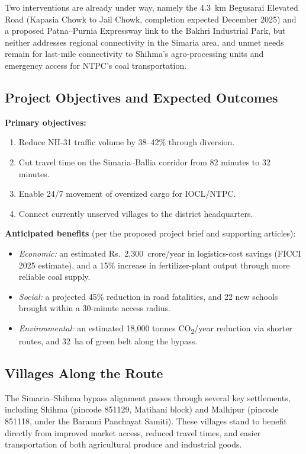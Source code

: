 \documentclass[11pt]{article}
\begin{document}
Two interventions are already under way, namely the 4.3~km Begusarai Elevated Road (Kapasia Chowk to
Jail Chowk, completion expected December 2025) and a proposed Patna--Purnia Expressway link to the
Bakhri Industrial Park, but neither addresses regional connectivity in the Simaria area, and unmet
needs remain for last-mile connectivity to Shihma's agro-processing units and emergency access for
NTPC's coal transportation.

\subsection{Project Objectives and Expected Outcomes}
\textbf{Primary objectives:}
\begin{enumerate}
  \item Reduce NH-31 traffic volume by 38--42\% through diversion.
  \item Cut travel time on the Simaria--Ballia corridor from 82 minutes to 32 minutes.
  \item Enable 24/7 movement of oversized cargo for IOCL/NTPC.
  \item Connect currently unserved villages to the district headquarters.
\end{enumerate}

\textbf{Anticipated benefits} (per the proposed project brief and supporting articles):
\begin{itemize}
  \item \emph{Economic:} an estimated Rs.~2,300~crore/year in logistics-cost savings (FICCI
  2025 estimate), and a 15\% increase in fertilizer-plant output through more reliable coal supply.
  \item \emph{Social:} a projected 45\% reduction in road fatalities, and 22 new schools brought within
  a 30-minute access radius.
  \item \emph{Environmental:} an estimated 18,000 tonnes CO\textsubscript{2}/year reduction via shorter
  routes, and 32~ha of green belt along the bypass.
\end{itemize}

\subsection{Villages Along the Route}
The Simaria--Shihma bypass alignment passes through several key settlements, including Shihma (pincode
851129, Matihani block) and Malhipur (pincode 851118, under the Barauni Panchayat Samiti). These
villages stand to benefit directly from improved market access, reduced travel times, and easier
transportation of both agricultural produce and industrial goods.
\end{document}
